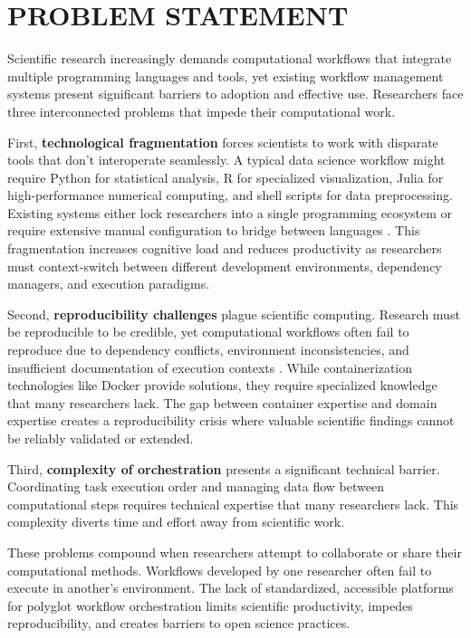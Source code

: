 \documentclass[12pt]{article}
\begin{document}
\newpage
\section{PROBLEM STATEMENT}

Scientific research increasingly demands computational workflows that integrate multiple programming languages and tools, yet existing workflow management systems present significant barriers to adoption and effective use. Researchers face three interconnected problems that impede their computational work.

First, \textbf{technological fragmentation} forces scientists to work with disparate tools that don't interoperate seamlessly. A typical data science workflow might require Python for statistical analysis, R for specialized visualization, Julia for high-performance numerical computing, and shell scripts for data preprocessing. Existing systems either lock researchers into a single programming ecosystem or require extensive manual configuration to bridge between languages \cite{perkel2019workflow}. This fragmentation increases cognitive load and reduces productivity as researchers must context-switch between different development environments, dependency managers, and execution paradigms.

Second, \textbf{reproducibility challenges} plague scientific computing. Research must be reproducible to be credible, yet computational workflows often fail to reproduce due to dependency conflicts, environment inconsistencies, and insufficient documentation of execution contexts \cite{stodden2016enhancing}. While containerization technologies like Docker provide solutions, they require specialized knowledge that many researchers lack. The gap between container expertise and domain expertise creates a reproducibility crisis where valuable scientific findings cannot be reliably validated or extended.

Third, \textbf{complexity of orchestration} presents a significant technical barrier. Coordinating task execution order and managing data flow between computational steps requires technical expertise that many researchers lack. This complexity diverts time and effort away from scientific work.

These problems compound when researchers attempt to collaborate or share their computational methods. Workflows developed by one researcher often fail to execute in another's environment. The lack of standardized, accessible platforms for polyglot workflow orchestration limits scientific productivity, impedes reproducibility, and creates barriers to open science practices. 
\end{document}
